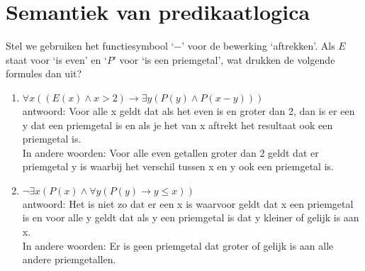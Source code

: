 \section{Semantiek van predikaatlogica}

 \begin{answer} %
 Stel we gebruiken het functiesymbool `$-$' voor de bewerking `aftrekken'. Als $E$ staat voor `is even' en `$P$' voor `is een priemgetal', wat drukken de volgende formules dan uit?
 \begin{enumerate}
     \item $\forall x((E(x)\wedge x>2)\rightarrow\exists y(P(y)\wedge P(x-y)))$ \\
     antwoord: Voor alle x geldt dat als het even is en groter dan 2, dan is er een y dat een priemgetal is en als je het van x aftrekt het resultaat ook een priemgetal is. \\
     In andere woorden: Voor alle even getallen groter dan 2 geldt dat er priemgetal y is waarbij het verschil tussen x en y ook een priemgetal is.
     \item $\neg\exists x(P(x)\wedge\forall y(P(y)\rightarrow y\leq x))$ \\
     antwoord: Het is niet zo dat er een x is waarvoor geldt dat x een priemgetal is en voor alle y geldt dat als y een priemgetal is dat y kleiner of gelijk is aan x. \\
     In andere woorden: Er is geen priemgetal dat groter of gelijk is aan alle andere priemgetallen. 
 \end{enumerate}
 \end{answer}
 
